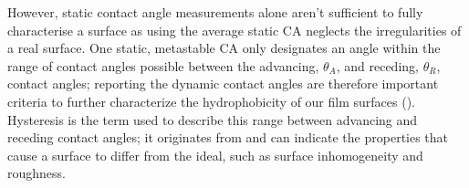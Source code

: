 However, static contact angle measurements alone aren’t sufficient to fully characterise a surface as using the average static CA neglects the irregularities of a real surface. One static, metastable CA only designates an angle within the range of contact angles possible between the advancing, $\theta_A$, and receding, $\theta_R$, contact angles; reporting the dynamic contact angles are therefore important criteria to further characterize the hydrophobicity of our film surfaces (\cite{gao_mccarthy_2006}). Hysteresis is the term used to describe this range between advancing and receding contact angles; it originates from and can indicate the properties that cause a surface to differ from the ideal, such as surface inhomogeneity and roughness. 

